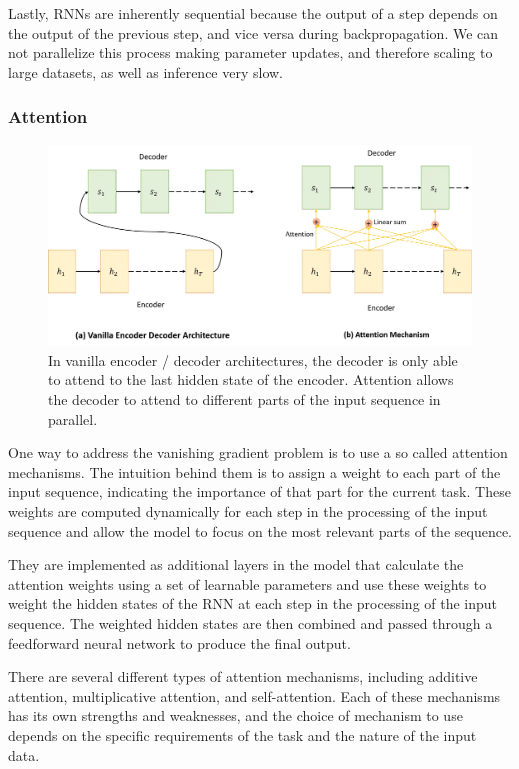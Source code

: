 Lastly, RNNs are inherently sequential because the output of a step depends on the output of the previous step, and vice versa during backpropagation.
We can not parallelize this process making parameter updates, and therefore scaling to large datasets, as well as inference very slow.

\subsubsection*{Attention}
\begin{figure}[h]
    \includegraphics[width=\linewidth]{chapters/NLP/figures/attention.png}
    \caption{In vanilla encoder / decoder architectures, the decoder is only able to attend to the last hidden state of the encoder. Attention allows the decoder to attend to different parts of the input sequence in parallel.}
    \label{fig:attention}
\end{figure}
One way to address the vanishing gradient problem is to use a so called attention mechanisms.\cite{https://doi.org/10.48550/arxiv.1409.0473}
The intuition behind them is to assign a weight to each part of the input sequence, indicating the importance of that part for the current task.
These weights are computed dynamically for each step in the processing of the input sequence and allow the model to focus on the most relevant parts of the sequence.

They are implemented as additional layers in the model that calculate the attention weights using a set of learnable parameters and use these weights to weight the hidden states of the RNN at each step in the processing of the input sequence.
The weighted hidden states are then combined and passed through a feedforward neural network to produce the final output.

There are several different types of attention mechanisms, including additive attention, multiplicative attention, and self-attention. Each of these mechanisms has its own strengths and weaknesses, and the choice of mechanism to use depends on the specific requirements of the task and the nature of the input data.


